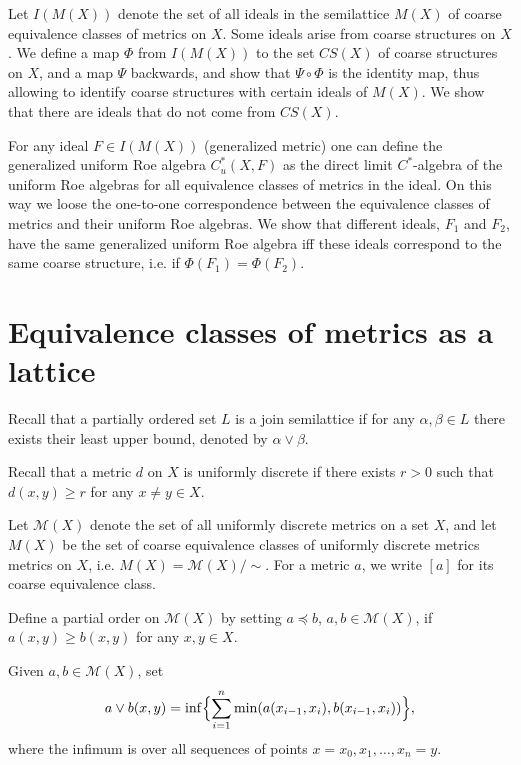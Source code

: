 \documentclass[reqno,12pt]{amsart}
\theoremstyle{plain}%
\theoremstyle{definition}
\theoremstyle{remark}
\numberwithin{equation}{section}
\begin{document}
Let $I(M(X))$ denote the set of all ideals in the semilattice $M(X)$ of coarse equivalence classes of metrics on $X$.
Some ideals arise from coarse structures on $X$. We define a map $\Phi$ from $I(M(X))$ to the set $CS(X)$ of coarse structures on $X$, and a map $\Psi$ backwards, and show that $\Psi\circ\Phi$ is the identity map, thus allowing to identify coarse structures with certain ideals of $M(X)$. We show that there are ideals that do not come from $CS(X)$.






For any ideal $F\in I(M(X))$ (generalized metric) one can define the generalized uniform Roe algebra $C^*_u(X,F)$ as the direct limit $C^*$-algebra of the uniform Roe algebras for all equivalence classes of metrics in the ideal. On this way we loose the one-to-one correspondence between the equivalence classes of metrics and their uniform Roe algebras. We show that different ideals, $F_1$ and $F_2$, have the same generalized uniform Roe algebra iff these ideals correspond to the same coarse structure, i.e. if $\Phi(F_1)=\Phi(F_2)$. 

\section{Equivalence classes of metrics as a lattice}

Recall that a partially ordered set $L$ is a join semilattice if for any $\alpha,\beta\in L$ there exists their least upper bound, denoted by $\alpha\lor \beta$. 

Recall that a metric $d$ on $X$ is uniformly discrete if there exists $r>0$ such that $d(x,y)\geq r$ for any $x\neq y\in X$.

Let $\mathcal M(X)$ denote the set of all uniformly discrete metrics on a set $X$, and let $M(X)$ be the set of coarse equivalence classes of uniformly discrete metrics metrics on $X$, i.e. $M(X)=\mathcal M(X)/\sim$. For a metric $a$, we write $[a]$ for its coarse equivalence class.

Define a partial order on $\mathcal M(X)$ by setting $a\preceq b$, $a,b\in\mathcal M(X)$, if $a(x,y)\geq b(x,y)$ for any $x,y\in X$. 

Given $a,b\in\mathcal M(X)$, set 
$$
a\lor b(x,y)=\inf\Bigl\{\sum_{i=1}^n\min(a(x_{i-1},x_i),b(x_{i-1},x_i))\Bigr\},
$$  
where the infimum is over all sequences of points $x=x_0,x_1,\ldots,x_n=y$.
\end{document}
